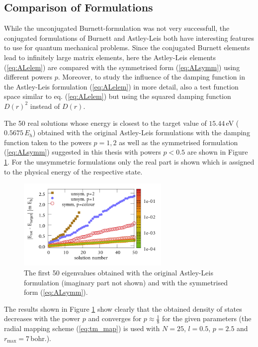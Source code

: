 \subsection{Comparison of Formulations}
\label{ch:bmFormul}
While the unconjugated Burnett-formulation was not very successfull, the conjugated formulations of Burnett and Astley-Leis both have interesting features to use for quantum mechanical problems.
Since the conjugated Burnett elements lead to infinitely large matrix elements, here the Astley-Leis elements (\ref{eq:ALelem}) are compared with the symmetrised form (\ref{eq:ALsymm}) using different powers $p$.
Moreover, to study the influence of the damping function in the Astley-Leis formulation (\ref{eq:ALelem}) in more detail, also a test function space similar to eq. (\ref{eq:ALelem}) but using the squared damping function $D(r)^2$ instead of $D(r)$.

The 50 real solutions whose energy is closest to the target value of $15.44\,$eV ($0.5675\,E_h$) obtained with the original Astley-Leis formulations with the damping function taken to the powers $p=1,2$ as well as the symmetrised formulation (\ref{eq:ALsymm}) suggested in this thesis with powers $p<0.5$ are shown in Figure \ref{fig:IFEMform_spect}.
For the unsymmetric formulations only the real part is shown which is assigned to the physical energy of the respective state.
\begin{figure}
\includegraphics[width=0.65\textwidth]{Figures/IFem_form_spectra}
\caption{The first 50 eigenvalues obtained with the original Astley-Leis formulation (imaginary part not shown) and with the symmetrised form (\ref{eq:ALsymm}).}
\label{fig:IFEMform_spect}
\end{figure}
The results shown in Figure \ref{fig:IFEMform_spect} show clearly that the obtained density of states decreases with the power $p$ and converges for $p\approx \frac 18$ for the given parameters (the radial mapping scheme (\ref{eq:tm_map}) is used with $N=25$, $l=0.5$, $p=2.5$ and $r_\text{max}=7\,$bohr.).

